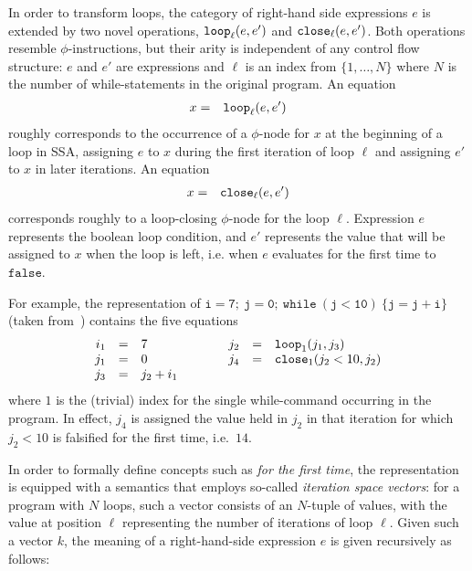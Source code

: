 In order to transform loops, the category of right-hand side
expressions $e$ is extended by two novel operations, $\mathtt{loop}_{{\ell}}({e},{e'})$ and $\mathtt{close}_{{\ell}}({e},{e'})$.
Both operations resemble $\phi$-instructions, but their arity is
independent of any control flow structure: $e$ and $e'$ are
expressions and $\ell$ is an index from $\{1,\ldots,N\}$ where $N$ is
the number of while-statements in the original program.  An equation
\begin{eqnarray*}
x & = & \mathtt{loop}_{{\ell}}({e},{e'})
\end{eqnarray*}
roughly corresponds to the occurrence of a $\phi$-node for $x$ at the
beginning of a loop in SSA, assigning $e$ to $x$ during the first
iteration of loop $\ell$ and assigning $e'$ to $x$ in later
iterations.
An equation 
\begin{eqnarray*}
x & = & \mathtt{close}_{{\ell}}({e},{e'})
\end{eqnarray*}
corresponds roughly to a loop-closing $\phi$-node for the loop
$\ell$. Expression $e$ represents the boolean loop condition, and $e'$
represents the value that will be assigned to $x$ when the loop is
left, i.e. when $e$ evaluates for the first time to $\mathtt{false}$.

For example, the representation of
$\mathtt{i=7;\ j=0;\ while\ (j<10)\ \{j=j+i\}}$
(taken from~\cite{PopJS2007}) contains the five equations
$$
\begin{array}{rclcrcl}
i_1 & = & 7 & \qquad & j_2 & = & \mathtt{loop}_{{1}}({j_1},{j_3})\\
j_1 & = & 0 & & j_4 & = & \mathtt{close}_{{1}}({j_2 < 10},{j_2})\\
j_3 & = & j_2 + i_1
\end{array} 
$$ 
where $1$ is the (trivial) index for the single while-command
occurring in the program.  In effect, $j_4$ is assigned the value held
in $j_2$ in that iteration for which $j_2 < 10$ is falsified for the
first time, i.e.~$14$.

In order to formally define concepts such as \emph{for the first
time}, the representation is equipped with a semantics that employs
so-called
\emph{iteration space vectors}: for a program with $N$ loops, such
a vector consists of an $N$-tuple of values, with the value at
position $\ell$ representing the number of iterations of loop $\ell$.
Given such a vector $k$, the meaning of a right-hand-side expression
$e$ is given recursively as follows:


